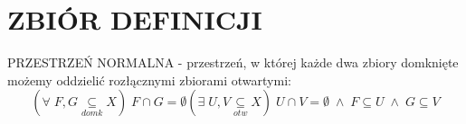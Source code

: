 \section{ZBIÓR DEFINICJI}
{\color{def}PRZESTRZEŃ NORMALNA} - przestrzeń, w której każde dwa zbiory domknięte możemy oddzielić rozłącznymi zbiorami otwartymi:
$$(\forall\; F,G\underset{domk}\subseteq X)\;F\cap G=\emptyset(\exists\; U,V\underset{otw}\subseteq X)\;U\cap V=\emptyset\;\land\;F\subseteq U\;\land\;G\subseteq V$$
